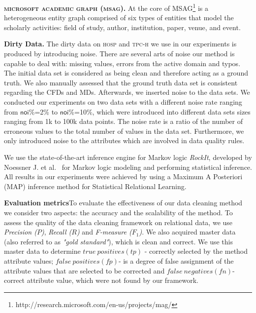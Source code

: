\textbf{\textsc{microsoft academic graph (msag)}.} \cite{msag2015} At the core of MSAG\footnote{http://research.microsoft.com/en-us/projects/mag/} is a heterogeneous entity graph comprised of six types of entities that model the scholarly activities: field of study, author, institution, paper, venue, and event.


\textbf{Dirty Data.} The dirty data on \textsc{hosp} and \textsc{tpc-h} we use in our experiments is produced by introducing noise. There are several arts of noise our method is capable to deal with: missing values, errors from the active domain and typos. The initial data set is considered as being clean and therefore acting as a ground truth. We also manually assessed that the ground truth data set is consistent regarding the CFDs and MDs. Afterwards, we inserted noise to the data sets. We conducted our experiments on two data sets with a different noise rate ranging from $\mathsf{noi\%}$=2$\%$ to $\mathsf{noi\%}$=10$\%$, which were introduced into different data sets sizes ranging from 1k to 100k data points. The noise rate is a ratio of the number of erroneous values to the total number of values in the data set. Furthermore, we only introduced noise to the attributes which are involved in data quality rules.

We use the state-of-the-art inference engine for Markov logic \textit{RockIt}, developed by Noessner J. et al.~\cite{NoessnerNS13} for Markov logic modeling and performing statistical inference. All results in our experiments were achieved by using a Maximum A Posteriori (MAP) inference method for Statistical Relational Learning.

\textbf{Evaluation metrics}To evaluate the effectiveness of our data cleaning method we consider two aspects: the accuracy and the scalability of the method. To assess the quality of the data cleaning framework on relational data, we use \textit{Precision ($P$)}, \textit{Recall ($R$)} and \textit{F-measure ($F_1$)}. We also acquired master data (also referred to as \textit{"gold standard"}), which is clean and correct. We use this master data to determine $true~positives (tp)$ - correctly selected by the method attribute values; $false~positives (fp)$- is a degree of false assignment of the attribute values that are selected to be corrected and $false~negatives (fn)$- correct attribute value, which were not found by our framework.

